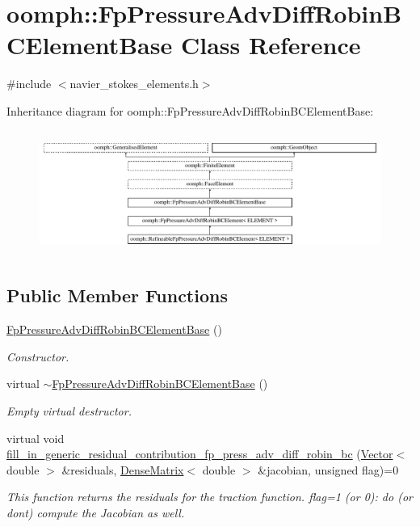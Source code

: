 \hypertarget{classoomph_1_1FpPressureAdvDiffRobinBCElementBase}{}\section{oomph\+:\+:Fp\+Pressure\+Adv\+Diff\+Robin\+B\+C\+Element\+Base Class Reference}
\label{classoomph_1_1FpPressureAdvDiffRobinBCElementBase}


{\ttfamily \#include $<$navier\+\_\+stokes\+\_\+elements.\+h$>$}

Inheritance diagram for oomph\+:\+:Fp\+Pressure\+Adv\+Diff\+Robin\+B\+C\+Element\+Base\+:\begin{figure}[H]
\begin{center}
\leavevmode
\includegraphics[height=4.127764cm]{classoomph_1_1FpPressureAdvDiffRobinBCElementBase}
\end{center}
\end{figure}
\subsection*{Public Member Functions}
\begin{DoxyCompactItemize}
\item 
\hyperlink{classoomph_1_1FpPressureAdvDiffRobinBCElementBase_a046874815cbcb8bf367877a60a3ce170}{Fp\+Pressure\+Adv\+Diff\+Robin\+B\+C\+Element\+Base} ()
\begin{DoxyCompactList}\small\item\em Constructor. \end{DoxyCompactList}\item 
virtual \hyperlink{classoomph_1_1FpPressureAdvDiffRobinBCElementBase_aa83b75a3502be930f57278fe728a316a}{$\sim$\+Fp\+Pressure\+Adv\+Diff\+Robin\+B\+C\+Element\+Base} ()
\begin{DoxyCompactList}\small\item\em Empty virtual destructor. \end{DoxyCompactList}\item 
virtual void \hyperlink{classoomph_1_1FpPressureAdvDiffRobinBCElementBase_ac6851ef329737b8f9d8cb0e0d9ae15d5}{fill\+\_\+in\+\_\+generic\+\_\+residual\+\_\+contribution\+\_\+fp\+\_\+press\+\_\+adv\+\_\+diff\+\_\+robin\+\_\+bc} (\hyperlink{classoomph_1_1Vector}{Vector}$<$ double $>$ \&residuals, \hyperlink{classoomph_1_1DenseMatrix}{Dense\+Matrix}$<$ double $>$ \&jacobian, unsigned flag)=0
\begin{DoxyCompactList}\small\item\em This function returns the residuals for the traction function. flag=1 (or 0)\+: do (or don\textquotesingle{}t) compute the Jacobian as well. \end{DoxyCompactList}\end{DoxyCompactItemize}
